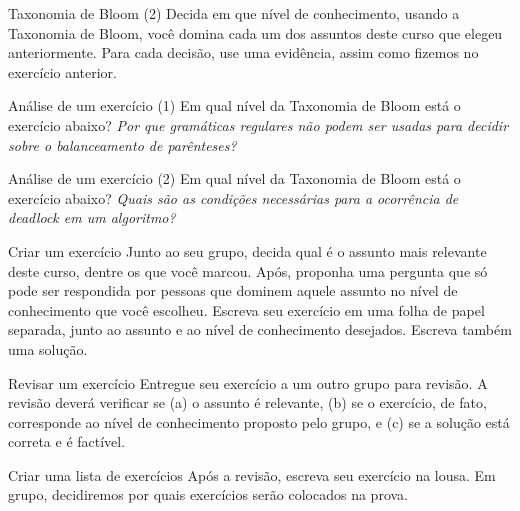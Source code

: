 \documentclass{beamer}
\begin{document}
\begin{frame}[fragile]{Taxonomia de Bloom (2)}
  \large
  Decida em que nível de conhecimento, usando a Taxonomia de Bloom, você domina
  cada um dos assuntos deste curso que elegeu anteriormente. Para cada decisão,
  use uma evidência, assim como fizemos no exercício anterior.
\end{frame}

\begin{frame}[fragile]{Análise de um exercício (1)}
  \large
  Em qual nível da Taxonomia de Bloom está o exercício abaixo?
  \vspace{1cm}
  \textit{Por que gramáticas regulares não podem ser usadas para decidir sobre o
  balanceamento de parênteses?}
\end{frame}

\begin{frame}[fragile]{Análise de um exercício (2)}
  \large
  Em qual nível da Taxonomia de Bloom está o exercício abaixo?
  \vspace{1cm}
  \textit{Quais são as condições necessárias para a ocorrência de deadlock em um
  algoritmo?}
\end{frame}

\begin{frame}[fragile]{Criar um exercício}
  \large
  Junto ao seu grupo, decida qual é o assunto mais relevante deste curso,
  dentre os que você
  marcou. Após, proponha uma pergunta que só pode ser respondida por pessoas que
  dominem aquele assunto no nível de conhecimento que você escolheu. Escreva seu
  exercício em uma folha de papel separada, junto ao assunto e ao nível de
  conhecimento desejados. Escreva também uma solução.
\end{frame}

\begin{frame}[fragile]{Revisar um exercício}
  \large
  Entregue seu exercício a um outro
  grupo para revisão. A revisão deverá verificar se (a) o assunto é relevante,
  (b) se o exercício, de fato, corresponde ao nível de conhecimento proposto
  pelo grupo, e (c) se a solução está correta e é factível.
\end{frame}

\begin{frame}[fragile]{Criar uma lista de exercícios}
  \large
  Após a revisão, escreva seu exercício na lousa. Em grupo, decidiremos por
  quais exercícios serão colocados na prova.
\end{frame}
\end{document}
